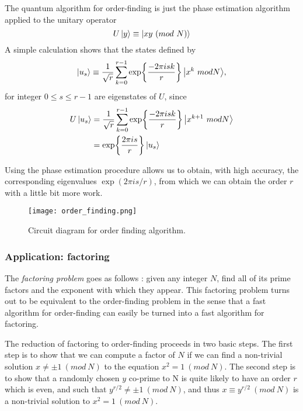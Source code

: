 The quantum algorithm for order-finding is just the phase estimation algorithm applied to the unitary operator
$$U\ket{y} \equiv \ket{xy\ (mod\ N)}$$
A simple calculation shows that the states defined by
$$\ket{u_s} \equiv \frac{1}{\sqrt{r}}\sum_{k=0}^{r-1}{\exp{\frac{-2\pi isk}{r}}\ket{x^k\ mod N}},$$
for integer $0 \le s \le r - 1$ are eigenstates of $U$, since
\begin{equation*}
\begin{split}
    U\ket{u_s} & = \frac{1}{\sqrt{r}}\sum_{k=0}^{r-1}{\exp{\frac{-2\pi isk}{r}}\ket{x^{k+1}\ mod N}}\\
    & = \exp{\frac{2\pi is}{r}}\ket{u_s}
\end{split}
\end{equation*}

Using the phase estimation procedure allows us to obtain, with high accuracy, the corresponding eigenvalues $\exp(2\pi is/r)$, from which we can obtain the order $r$ with a little bit more work.

\begin{figure}[h]
    \centering
    \texttt{[image: order\_finding.png]}
    \caption{Circuit diagram for order finding algorithm.}
\end{figure}

\subsubsection{Application: factoring}

The \textit{factoring problem} goes as follows : given any integer $N$, find all of its prime factors and the exponent with which they appear. This factoring problem turns out to be equivalent to the order-finding problem in the sense that a fast algorithm for order-finding can easily be turned into a fast algorithm for factoring.
\vspace{1em}

The reduction of factoring to order-finding proceeds in two basic steps. The first step is to show that we can compute a factor of $N$ if we can find a non-trivial solution $x \neq \pm 1\ (mod\ N)$ to the equation $x^2 = 1\ (mod\ N)$. The second step is to show that a randomly chosen $y$ co-prime to N is quite likely to have an order $r$ which is even, and such that $y^{r/2} \neq \pm 1\ (mod\ N)$, and thus $x \equiv y^{r/2}\ (mod\ N)$ is a non-trivial solution to $x^2 = 1\ (mod\ N)$.

